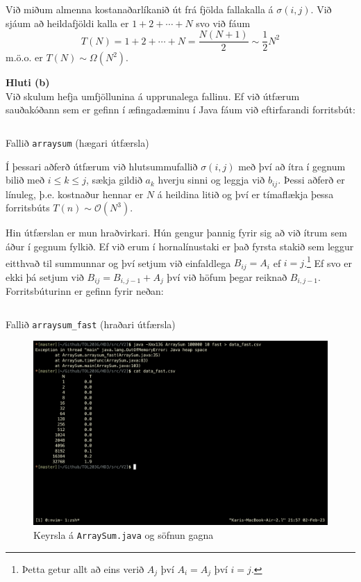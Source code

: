 \documentclass[12pt, a4paper, hidelinks]{article}
\begin{document}
\noindent
Við miðum almenna kostanaðarlíkanið út frá fjölda fallakalla á $\sigma(i, j)$. Við sjáum
að heildafjöldi kalla er $1 + 2 + \cdots + N$ svo við fáum
\[
    T(N) = 1 + 2 + \cdots + N = \frac{N(N + 1)}{2} \sim \frac 12 N^2
\]
m.ö.o. er $T(N) \sim \Omega(N^2)$.

\newpage
\noindent
\textbf{Hluti (b)} \medskip \\
Við skulum hefja umfjöllunina á upprunalega fallinu. Ef við útfærum sauðakóðann
sem er gefinn í æfingadæminu í Java fáum við eftirfarandi forritsbút:

\begin{listing}[ht!]
    \centering
    \inputminted[firstline=13, lastline=22, linenos]{java}{../src/V2/ArraySum.java}
    \caption{Fallið \texttt{arraysum} (hægari útfærsla)}
    \label{forrit2}
\end{listing}

\noindent
Í þessari aðferð útfærum við hlutsummufallið $\sigma(i, j)$ með því að ítra í gegnum bilið
með $i \leq k \leq j$, sækja gildið $a_k$ hverju sinni og leggja við $b_{ij}$. Þessi aðferð
er línuleg, þ.e. kostnaður hennar er $N$ á heildina litið og því er tímaflækja þessa forritsbúts
$T(n) \sim \mathcal O(N^3)$.

Hin útfærslan er mun hraðvirkari. Hún gengur þannig fyrir sig að við ítrum sem áður í gegnum fylkið.
Ef við erum í hornalínustaki er það fyrsta stakið sem leggur eitthvað til summunnar og því setjum við
einfaldlega $B_{ij} = A_i$ ef $i = j$.\footnote{Þetta getur allt að eins verið $A_j$ því $A_i = A_j$ því $i = j$.} 
Ef svo er ekki þá setjum við $B_{ij} = B_{i, j-1} + A_j$ því við höfum þegar reiknað $B_{i, j-1}$. Forritsbúturinn er gefinn fyrir neðan:

\begin{listing}[ht!]
    \centering 
    \inputminted[firstline=31, lastline=39, linenos]{java}{../src/V2/ArraySum.java}
    \caption{Fallið \texttt{arraysum\_fast} (hraðari útfærsla)}
    \label{forrit3}
\end{listing}

\begin{figure}[ht!]
    \centering
    \includegraphics[width=\textwidth]{img/arraysum_keyrsla.png}
    \caption{Keyrsla á \texttt{ArraySum.java} og söfnun gagna}
\end{figure}
\end{document}
